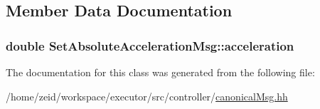 \subsection{Member Data Documentation}
\hypertarget{class_set_absolute_acceleration_msg_aae003f32dbcb00ab03c61b896c1b2c16}{
\subsubsection[{acceleration}]{\setlength{\rightskip}{0pt plus 5cm}double {\bf SetAbsoluteAccelerationMsg::acceleration}}}
\label{class_set_absolute_acceleration_msg_aae003f32dbcb00ab03c61b896c1b2c16}


The documentation for this class was generated from the following file:\begin{DoxyCompactItemize}
\item 
/home/zeid/workspace/executor/src/controller/\hyperlink{canonical_msg_8hh}{canonicalMsg.hh}\end{DoxyCompactItemize}
